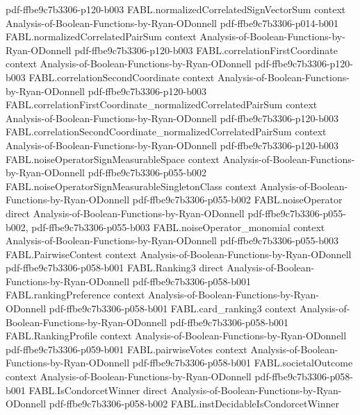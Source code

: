 \begin{theorem}
  {pdf-ffbe9c7b3306-p120-b003}
\proofstep
  {FABL.normalizedCorrelatedSignVectorSum}
  {context}
  {Analysis-of-Boolean-Functions-by-Ryan-ODonnell}
  {pdf-ffbe9c7b3306-p014-b001}
\proofstep
  {FABL.normalizedCorrelatedPairSum}
  {context}
  {Analysis-of-Boolean-Functions-by-Ryan-ODonnell}
  {pdf-ffbe9c7b3306-p120-b003}
\proofstep
  {FABL.correlationFirstCoordinate}
  {context}
  {Analysis-of-Boolean-Functions-by-Ryan-ODonnell}
  {pdf-ffbe9c7b3306-p120-b003}
\proofstep
  {FABL.correlationSecondCoordinate}
  {context}
  {Analysis-of-Boolean-Functions-by-Ryan-ODonnell}
  {pdf-ffbe9c7b3306-p120-b003}
\proofstep
  {FABL.correlationFirstCoordinate_normalizedCorrelatedPairSum}
  {context}
  {Analysis-of-Boolean-Functions-by-Ryan-ODonnell}
  {pdf-ffbe9c7b3306-p120-b003}
\proofstep
  {FABL.correlationSecondCoordinate_normalizedCorrelatedPairSum}
  {context}
  {Analysis-of-Boolean-Functions-by-Ryan-ODonnell}
  {pdf-ffbe9c7b3306-p120-b003}
\proofstep
  {FABL.noiseOperatorSignMeasurableSpace}
  {context}
  {Analysis-of-Boolean-Functions-by-Ryan-ODonnell}
  {pdf-ffbe9c7b3306-p055-b002}
\proofstep
  {FABL.noiseOperatorSignMeasurableSingletonClass}
  {context}
  {Analysis-of-Boolean-Functions-by-Ryan-ODonnell}
  {pdf-ffbe9c7b3306-p055-b002}
\proofstep
  {FABL.noiseOperator}
  {direct}
  {Analysis-of-Boolean-Functions-by-Ryan-ODonnell}
  {pdf-ffbe9c7b3306-p055-b002,
    pdf-ffbe9c7b3306-p055-b003}
\proofstep
  {FABL.noiseOperator_monomial}
  {context}
  {Analysis-of-Boolean-Functions-by-Ryan-ODonnell}
  {pdf-ffbe9c7b3306-p055-b003}
\proofstep
  {FABL.PairwiseContest}
  {context}
  {Analysis-of-Boolean-Functions-by-Ryan-ODonnell}
  {pdf-ffbe9c7b3306-p058-b001}
\proofstep
  {FABL.Ranking3}
  {direct}
  {Analysis-of-Boolean-Functions-by-Ryan-ODonnell}
  {pdf-ffbe9c7b3306-p058-b001}
\proofstep
  {FABL.rankingPreference}
  {context}
  {Analysis-of-Boolean-Functions-by-Ryan-ODonnell}
  {pdf-ffbe9c7b3306-p058-b001}
\proofstep
  {FABL.card_ranking3}
  {context}
  {Analysis-of-Boolean-Functions-by-Ryan-ODonnell}
  {pdf-ffbe9c7b3306-p058-b001}
\proofstep
  {FABL.RankingProfile}
  {context}
  {Analysis-of-Boolean-Functions-by-Ryan-ODonnell}
  {pdf-ffbe9c7b3306-p059-b001}
\proofstep
  {FABL.pairwiseVotes}
  {context}
  {Analysis-of-Boolean-Functions-by-Ryan-ODonnell}
  {pdf-ffbe9c7b3306-p058-b001}
\proofstep
  {FABL.societalOutcome}
  {context}
  {Analysis-of-Boolean-Functions-by-Ryan-ODonnell}
  {pdf-ffbe9c7b3306-p058-b001}
\proofstep
  {FABL.IsCondorcetWinner}
  {direct}
  {Analysis-of-Boolean-Functions-by-Ryan-ODonnell}
  {pdf-ffbe9c7b3306-p058-b002}
\proofstep
  {FABL.instDecidableIsCondorcetWinner}

\end{theorem}
